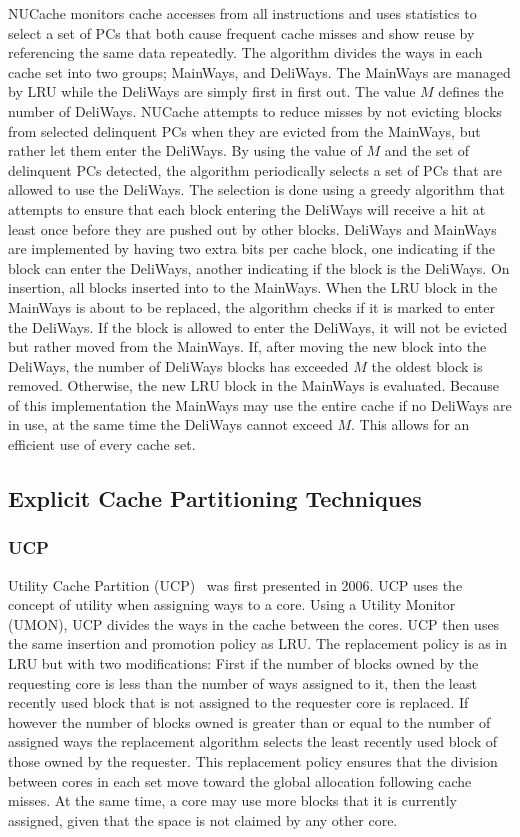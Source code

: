 NUCache monitors cache accesses from all instructions and uses statistics to select a set of PCs that both cause frequent cache misses and show reuse by referencing the same data repeatedly.
The algorithm divides the ways in each cache set into two groups; MainWays, and DeliWays.
The MainWays are managed by LRU while the DeliWays are simply first in first out.
The value $M$ defines the number of DeliWays.
NUCache attempts to reduce misses by not evicting blocks from selected delinquent PCs when they are evicted from the MainWays, but rather let them enter the DeliWays.
By using the value of $M$ and the set of delinquent PCs detected, the algorithm periodically selects a set of PCs that are allowed to use the DeliWays.
The selection is done using a greedy algorithm that attempts to ensure that each block entering the DeliWays will receive a hit at least once before they are pushed out by other blocks.
DeliWays and MainWays are implemented by having two extra bits per cache block, one indicating if the block can enter the DeliWays, another indicating if the block is the DeliWays.
On insertion, all blocks inserted into to the MainWays.
When the LRU block in the MainWays is about to be replaced, the algorithm checks if it is marked to enter the DeliWays.
If the block is allowed to enter the DeliWays, it will not be evicted but rather moved from the MainWays.
If, after moving the new block into the DeliWays, the number of DeliWays blocks has exceeded $M$ the oldest block is removed.
Otherwise, the new LRU block in the MainWays is evaluated.
Because of this implementation the MainWays may use the entire cache if no DeliWays are in use, at the same time the DeliWays cannot exceed $M$.
This allows for an efficient use of every cache set.

\subsection{Explicit Cache Partitioning Techniques}

\subsubsection{UCP}

Utility Cache Partition (UCP)~\cite{Qureshi2006} was first presented in 2006. 
UCP uses the concept of utility when assigning ways to a core.
Using a Utility Monitor (UMON), UCP divides the ways in the cache between the cores.
UCP then uses the same insertion and promotion policy as LRU.
The replacement policy is as in LRU but with two modifications:
First if the number of blocks owned by the requesting core is less than the number of ways assigned to it, then the least recently used block that is not assigned to the requester core is replaced.
If however the number of blocks owned is greater than or equal to the number of assigned ways the replacement algorithm selects the least recently used block of those owned by the requester.
This replacement policy ensures that the division between cores in each set move toward the global allocation following cache misses.
At the same time, a core may use more blocks that it is currently assigned, given that the space is not claimed by any other core.


